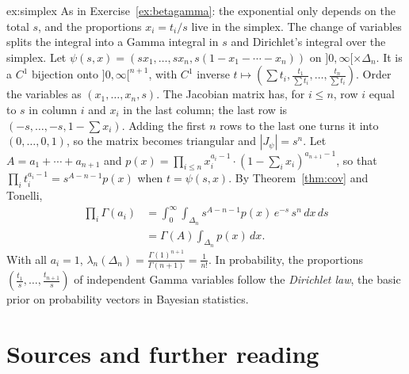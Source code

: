 \begin{solution}{ex:simplex}
\idea As in Exercise~\ref{ex:betagamma}: the exponential only depends on the total $s$, and the proportions $x_i=t_i/s$ live in the simplex. The change of variables splits the integral into a Gamma
integral in $s$ and Dirichlet's integral over the simplex.
\writeup Let $\psi(s,x)=(sx_1,\dots,sx_n,s(1-x_1-\cdots-x_n))$ on $]0,\infty[\times\Delta_n$. It is a $C^1$ bijection onto $]0,\infty[^{n+1}$, with $C^1$ inverse $t\mapsto(\sum t_i,\frac{t_1}{\sum t_i},\dots,\frac{t_n}{\sum t_i})$. Order
the variables as $(x_1,\dots,x_n,s)$. The Jacobian matrix has, for $i\le n$, row $i$ equal to $s$ in column $i$ and $x_i$ in the last column; the last row is $(-s,\dots,-s,1-\sum x_i)$. Adding the first $n$
rows to the last one turns it into $(0,\dots,0,1)$, so the matrix becomes triangular and $|J_\psi|=s^n$. Let $A=a_1+\cdots+a_{n+1}$ and $p(x)=\prod_{i\le n}x_i^{a_i-1}\cdot(1-\sum_ix_i)^{a_{n+1}-1}$, so that $\prod_it_i^{a_i-1}=s^{A-n-1}p(x)$ when $t=\psi(s,x)$. By Theorem~\ref{thm:cov} and Tonelli,
\[\begin{aligned}\prod_i\Gamma(a_i)&=\int_0^\infty\!\!\int_{\Delta_n}s^{A-n-1}p(x)\,e^{-s}\,s^n\,dx\,ds\\&=\Gamma(A)\int_{\Delta_n}p(x)\,dx.\end{aligned}\]
With all $a_i=1$, $\lambda_n(\Delta_n)=\frac{\Gamma(1)^{n+1}}{\Gamma(n+1)}=\frac1{n!}$. In probability, the proportions $(\frac{t_1}s,\dots,\frac{t_{n+1}}s)$ of independent Gamma variables follow the \emph{Dirichlet law}, the
basic prior on probability vectors in Bayesian statistics.
\end{solution}

\section*{Sources and further reading}

